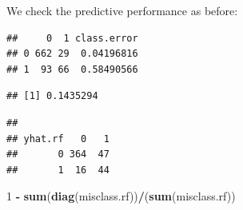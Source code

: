 \documentclass[10pt,ignorenonframetext,]{beamer}
\newenvironment{Shaded}{\begin{snugshade}}{\end{snugshade}}
\newcommand{\KeywordTok}[1]{\textcolor[rgb]{0.13,0.29,0.53}{\textbf{#1}}}
\newcommand{\DataTypeTok}[1]{\textcolor[rgb]{0.13,0.29,0.53}{#1}}
\newcommand{\DecValTok}[1]{\textcolor[rgb]{0.00,0.00,0.81}{#1}}
\newcommand{\StringTok}[1]{\textcolor[rgb]{0.31,0.60,0.02}{#1}}
\newcommand{\OperatorTok}[1]{\textcolor[rgb]{0.81,0.36,0.00}{\textbf{#1}}}
\newcommand{\NormalTok}[1]{#1}
\begin{document}
\begin{frame}[fragile]

We check the predictive performance as before:

\tiny

\begin{Shaded}
\end{Shaded}

\begin{verbatim}
##     0  1 class.error
## 0 662 29  0.04196816
## 1  93 66  0.58490566
\end{verbatim}

\begin{Shaded}
\end{Shaded}

\begin{verbatim}
## [1] 0.1435294
\end{verbatim}

\begin{Shaded}
\end{Shaded}

\begin{verbatim}
##        
## yhat.rf   0   1
##       0 364  47
##       1  16  44
\end{verbatim}

\begin{Shaded}
\begin{Highlighting}[]
\DecValTok{1} \OperatorTok{-}\StringTok{ }\KeywordTok{sum}\NormalTok{(}\KeywordTok{diag}\NormalTok{(misclass.rf))}\OperatorTok{/}\NormalTok{(}\KeywordTok{sum}\NormalTok{(misclass.rf))}
\end{Highlighting}
\end{Shaded}


\end{frame}
\end{document}
